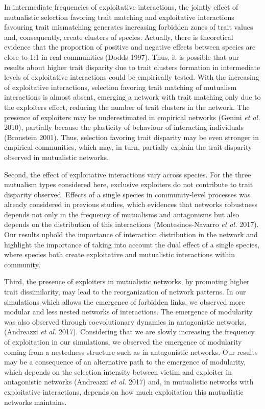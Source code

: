 \documentclass[a4paper, 12pt]{article}
\begin{document}
In intermediate frequencies of exploitative interactions, the jointly effect of mutualistic selection favoring trait matching and exploitative interactions favouring trait mismatching generates increasing forbidden zones of trait values and, consequently, create clusters of species. Actually, there is theoretical evidence that the proportion of positive and negative effects between species are close to 1:1 in real communities (Dodds 1997). Thus, it is possible that our results about higher trait disparity due to trait clusters formation in intermediate levels of exploitative interactions could be empirically tested. With the increasing of exploitative interactions, selection favoring trait matching of mutualism interactions is almost absent, emerging a network with trait matching only due to the exploiters effect, reducing  the number of trait clusters in the network. The presence of exploiters may be underestimated in empirical networks (Genini \textit{et al.} 2010), partially because the plasticity of behaviour of interacting individuals (Bronstein 2001). Thus, selection favoring trait disparity may be even stronger in empirical communities, which may, in turn, partially explain the trait disparity observed in mutualistic networks.

Second, the effect of exploitative interactions vary across species. For the three mutualism types considered here, exclusive exploiters do not contribute to trait disparity observed. Effects of a single species in community-level processes was already considered in previous studies, which evidences that networks robustness depends not only in the frequency of mutualisms and antagonisms but also depends on the distribution of this interactions (Montesinos-Navarro \textit{et al.} 2017). Our results uphold the importance of interaction distribution in the network and highlight the importance of taking into account the dual effect of a single species, where species both create exploitative and mutualistic interactions within  community.

Third, the presence of exploiters in mutualistic networks, by promoting higher trait dissimilarity, may lead to the reorganization of network patterns. In our simulations which allows the emergence of forbidden links, we observed more modular and less nested networks of interactions. The emergence of modularity was also observed through coevolutionary dynamics in antagonistic networks, (Andreazzi \textit{et al.} 2017). Considering that we are slowly increasing the frequency of exploitation in our simulations, we observed the emergence of modularity coming from a nestedness structure such as in antagonistic networks. Our results may be a consequence of an alternative path to the emergence of modularity, which depends on the selection intensity between victim and exploiter in antagonistic networks (Andreazzi \textit{et al.} 2017) and, in mutualistic networks with exploitative interactions, depends on how much exploitation this mutualistic networks maintains.
\end{document}
